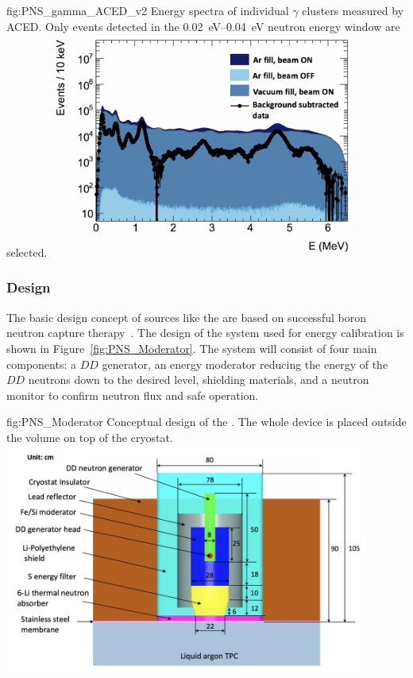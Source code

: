 \begin{dunefigure}{fig:PNS_gamma_ACED_v2}
{Energy spectra of individual $\gamma$ clusters measured by ACED. Only events detected in the \SIrange{0.02}{0.04}{eV} neutron energy window are selected.}
\includegraphics[width=10cm]{graphics/PNS_gamma_ACED_v2.png}
\end{dunefigure}


\subsubsection{Design}
\label{sec:dp-calib-sys-pns-des}

The basic design concept of sources like the  are based on successful boron neutron capture therapy~\cite{bib:Koivunoro2004}. The design of the  system used for energy calibration is shown in Figure~\ref{fig:PNS_Moderator}. The system will consist of four main components: a $DD$ generator, an energy moderator reducing the energy of the $DD$ neutrons down to the desired level, shielding materials, and a neutron monitor to confirm neutron flux and safe operation. 

\begin{dunefigure}{fig:PNS_Moderator}
{Conceptual design of the . The whole device is placed outside the  volume on top of the cryostat.}
\includegraphics[width=12cm]{graphics/PNS_Moderator.png}
\end{dunefigure}


